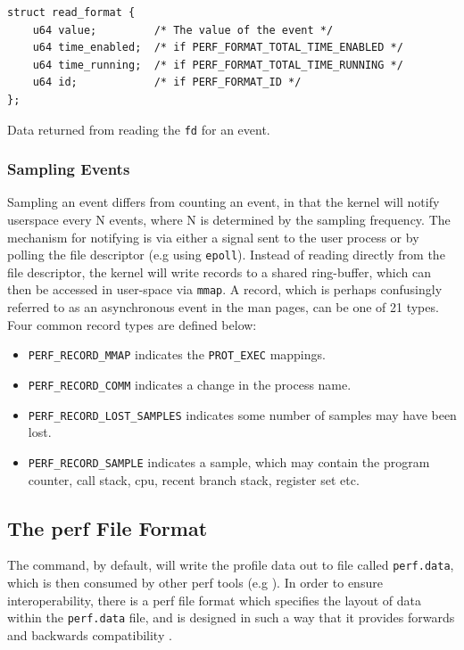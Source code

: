 \begin{listing}
    \begin{verbatim}
struct read_format {
    u64 value;         /* The value of the event */
    u64 time_enabled;  /* if PERF_FORMAT_TOTAL_TIME_ENABLED */
    u64 time_running;  /* if PERF_FORMAT_TOTAL_TIME_RUNNING */
    u64 id;            /* if PERF_FORMAT_ID */
};
    \end{verbatim}
    \caption{Data returned from reading the \texttt{fd} for an event.}
    \label{lst:struct_read_format}
\end{listing}

\subsubsection{Sampling Events}

Sampling an event differs from counting an event, in that the kernel will notify userspace every N events, where N is determined by the sampling frequency. The mechanism for notifying is via either a signal sent to the user process or by polling the file descriptor (e.g using \texttt{epoll}). Instead of reading directly from the file descriptor, the kernel will write records to a shared ring-buffer, which can then be accessed in user-space via \texttt{mmap}. A record, which is perhaps confusingly referred to as an asynchronous event in the man pages, can be one of 21 types. Four common record types are defined below:

\ssp
\begin{itemize}
    \item \texttt{PERF\_RECORD\_MMAP} indicates the \texttt{PROT\_EXEC} mappings. 
    \item \texttt{PERF\_RECORD\_COMM} indicates a change in the process name.
    \item \texttt{PERF\_RECORD\_LOST\_SAMPLES} indicates some number of samples may have been lost.
    \item \texttt{PERF\_RECORD\_SAMPLE} indicates a sample, which may contain the program counter, call stack, cpu, recent branch stack, register set etc. 
\end{itemize}
\dsp

\subsection{The perf File Format}\label{sect:perf_file_format}

The  command, by default, will write the profile data out to file called \texttt{perf.data}, which is then consumed by other perf tools (e.g ). In order to ensure interoperability, there is a perf file format which specifies the layout of data within the \texttt{perf.data} file, and is designed in such a way that it provides forwards and backwards compatibility \cite{GithubPerfFileFormat}.

